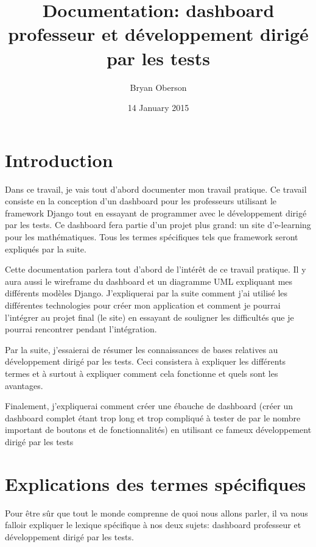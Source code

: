 \documentclass[letterpaper,10pt,french]{sphinxmanual}
\title{Documentation: dashboard professeur et développement dirigé par les tests}
\date{14 January 2015}
\author{Bryan Oberson}
\begin{document}
\maketitle
\tableofcontents
{}\label{index::doc}



\chapter{Introduction}
\label{introduction:introduction}\label{introduction:conception-du-dashboard-professeur-a-laide-du-developpement-dirige-par-les-tests}\label{introduction::doc}
Dans ce travail, je vais tout d'abord documenter mon travail pratique. Ce
travail consiste en la conception d'un dashboard pour les professeurs
utilisant le framework Django tout en essayant de programmer
avec le développement dirigé par les tests.
Ce dashboard fera partie d'un projet plus grand: un site d'e-learning pour les
mathématiques.
Tous les termes spécifiques tels que framework seront expliqués par la suite.

Cette documentation parlera tout d'abord de l'intérêt de ce travail pratique.
Il y aura aussi le wireframe du dashboard et un diagramme UML expliquant mes
différents modèles Django. J'expliquerai par la suite comment j'ai utilisé
les différentes technologies pour créer mon application et comment
je pourrai l'intégrer au projet final (le site) en essayant de souligner les
difficultés que je pourrai rencontrer pendant l'intégration.

Par la suite, j'essaierai de résumer les connaissances de bases relatives
au développement dirigé par les tests. Ceci consistera à expliquer les
différents termes et à surtout à expliquer comment cela fonctionne et quels
sont les avantages.

Finalement, j'expliquerai comment créer une ébauche de dashboard (créer un
dashboard complet étant trop long et trop compliqué à tester de par le nombre
important de boutons et de fonctionnalités) en utilisant ce fameux
développement dirigé par les tests


\chapter{Explications des termes spécifiques}
\label{introduction:explications-des-termes-specifiques}
Pour être sûr que tout le monde comprenne de quoi nous allons parler,
il va nous falloir expliquer le lexique spécifique à nos deux sujets:
dashboard professeur et développement dirigé par les tests.
\end{document}
